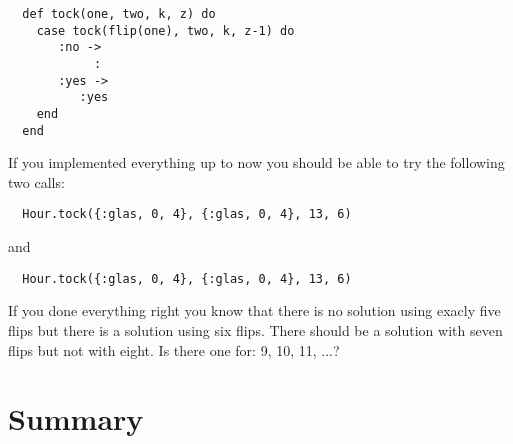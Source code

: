 \documentclass[a4paper,11pt]{article}
\begin{document}
\begin{verbatim}
  def tock(one, two, k, z) do
    case tock(flip(one), two, k, z-1) do 
       :no ->
            :
       :yes ->
          :yes     
    end
  end 
\end{verbatim}

If you implemented everything up to now you should be able to try the
following two calls:

\begin{verbatim}
  Hour.tock({:glas, 0, 4}, {:glas, 0, 4}, 13, 6)
\end{verbatim}
and
\begin{verbatim}
  Hour.tock({:glas, 0, 4}, {:glas, 0, 4}, 13, 6)
\end{verbatim}

If you done everything right you know that there is no solution using
exacly five flips but there is a solution using six flips. There
should be a solution with seven flips but not with eight. Is there one
for: 9, 10, 11, ...?






\section*{Summary}


  
\end{document}
